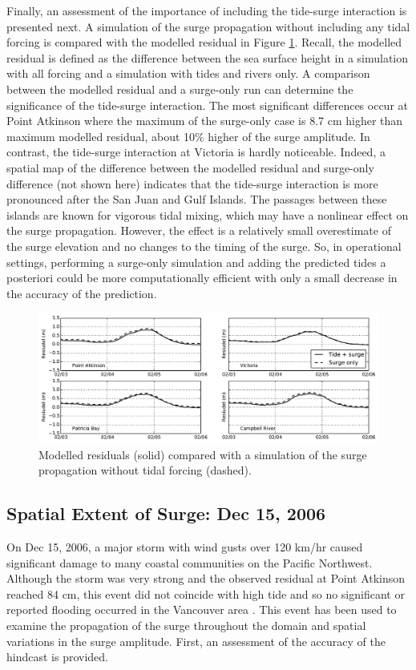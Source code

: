 \documentclass[pdftex,10pt]{article}
\begin{document}
Finally, an assessment of the importance of including the tide-surge interaction is presented next. A simulation of the surge propagation without including any tidal forcing is compared with the modelled residual in Figure \ref{fig:tidesurge}.  Recall, the modelled residual is defined as the difference between the sea surface height in a simulation with all forcing and a simulation with tides and rivers only. A comparison between the modelled residual and a surge-only run can determine the significance of the tide-surge interaction. The most significant differences occur at Point Atkinson where the maximum of the surge-only case is 8.7 cm higher than maximum modelled residual, about 10\% higher of the surge amplitude.  In contrast, the tide-surge interaction at Victoria is hardly noticeable. Indeed, a spatial map of the difference between the modelled residual and surge-only difference (not shown here) indicates that the tide-surge interaction is more pronounced after the San Juan and Gulf Islands. The passages between these islands are known for vigorous tidal mixing, which may have a nonlinear effect on the surge propagation. However, the effect is a relatively small overestimate of the surge elevation and no changes to the timing of the surge. So, in operational settings, performing a surge-only simulation and adding the predicted tides a posteriori could be more computationally efficient with only a small decrease in the accuracy of the prediction. 

\begin{figure}
\centering
\includegraphics[scale=0.6]{Figures/feb2006_tidesurge.pdf}
\caption{Modelled residuals (solid) compared with a simulation of the surge propagation without tidal forcing (dashed). }
\label{fig:tidesurge}
\end{figure}

\subsection{Spatial Extent of Surge: Dec 15, 2006}
On Dec 15, 2006, a major storm with wind gusts over 120 km/hr caused significant damage to many coastal communities on the Pacific Northwest. Although the storm was very strong and the observed residual at Point Atkinson reached 84 cm, this event did not coincide with high tide and so no significant or reported flooding occurred in the Vancouver area \citep{forseth2006adaptation}. This event has been used to examine the propagation of the surge throughout the domain and spatial variations in the surge amplitude. First, an assessment of the accuracy of the hindcast is provided. 
\end{document}
